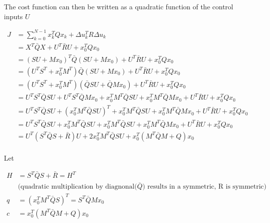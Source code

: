 \documentclass{article}
\begin{document}
The cost function can then be written as a quadratic function of the control inputs $U$

\begin{equation}
  \begin{aligned}
    J &= \sum_{k=0}^{N-1} x_k^T Q x_k + \Delta u_k^T R \Delta u_k \\
    &= X^T \bar{Q} X + U^T \bar{R} U + x_0^T Q x_0 \\
    &= (S U + M x_0)^T \bar{Q} (S U + M x_0) + U^T \bar{R} U + x_0^T Q x_0 \\
    &= (U^T S^T + x_0^T M^T) \bar{Q} (S U + M x_0) + U^T \bar{R} U + x_0^T Q x_0 \\
    &= (U^T S^T + x_0^T M^T) (\bar{Q} S U + \bar{Q} M x_0) + U^T \bar{R} U + x_0^T Q x_0 \\
    &= U^T S^T \bar{Q} S U + U^T S^T \bar{Q} M x_0 + x_0^T M^T \bar{Q} S U + x_0^T M^T \bar{Q} M x_0 + U^T \bar{R} U + x_0^T Q x_0 \\
    &= U^T S^T \bar{Q} S U + (x_0^T M^T \bar{Q} S U)^T + x_0^T M^T \bar{Q} S U + x_0^T M^T \bar{Q} M x_0 + U^T \bar{R} U + x_0^T Q x_0 \\
    &= U^T S^T \bar{Q} S U + x_0^T M^T \bar{Q} S U + x_0^T M^T \bar{Q} S U + x_0^T M^T \bar{Q} M x_0 + U^T \bar{R} U + x_0^T Q x_0 \\
    &= U^T (S^T \bar{Q} S + \bar{R}) U + 2 x_0^T M^T \bar{Q} S U + x_0^T(M^T \bar{Q} M + Q) x_0\\
  \end{aligned}
\end{equation}

Let

$$
\begin{aligned}
  H &= S^T \bar{Q} S + \bar{R} = H^T \\
  &\text{(quadratic multiplication by diagnonal($\bar{Q}$) results in a symmetric, R is symmetric)} \\
  q &= (x_0^T M^T \bar{Q} S)^T = S^T \bar{Q} M x_0 \\
  c &= x_0^T (M^T \bar{Q} M + Q) x_0
\end{aligned}
$$
\end{document}
